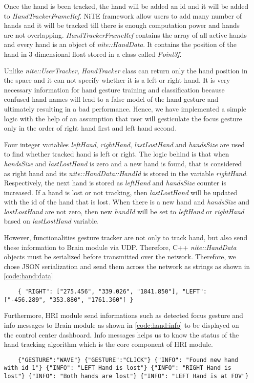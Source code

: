 Once the hand is been tracked, the hand will be added an id and it will be added to \textit{HandTrackerFrameRef}. NiTE framework allow users to add many number of hands and it will be tracked till there is enough computation power and hands are not overlapping. \textit{HandTrackerFrameRef} contains the array of all active hands and every hand is an object of \textit{nite::HandData}. It contains the position of the hand in 3 dimensional float stored in a class called \textit{Point3f}.

Unlike \textit{nite::UserTracker}, \textit{HandTracker} class can return only the hand position in the space and it can not specify whether it is a left or right hand. It is very necessary information for hand gesture training and classification because confused hand names will lead to a false model of the hand gesture and ultimately resulting in a bad performance. Hence, we have implemented a simple logic with the help of an assumption that user will gesticulate the focus gesture only in the order of right hand first and left hand second. 

Four integer variables \textit{leftHand}, \textit{rightHand}, \textit{lastLostHand} and \textit{handsSize} are used to find whether tracked hand is left or right. The logic behind is that when \textit{handsSize} and \textit{lastLostHand} is zero and a new hand is found, that is considered as right hand and its \textit{nite::HandData::HandId} is stored in the variable \textit{rightHand}. Respectively, the next hand is stored as \textit{leftHand} and \textit{handsSize} counter is increased. If a hand is lost or not tracking, then \textit{lastLostHand} will be updated with the id of the hand that is lost. When there is a new hand and \textit{handsSize} and \textit{lastLostHand} are not zero, then new \textit{handId} will be set to \textit{leftHand} or \textit{rightHand} based on \textit{lastLostHand} variable.

However, functionalities gesture tracker are not only to track hand, but also send these information to Brain module via UDP. Therefore, C++ \textit{nite::HandData} objects must be serialized before transmitted over the network. Therefore, we chose JSON serialization and send them across the network as strings as shown in \ref{code:hand:data} 
\begin{lstlisting}
	{ "RIGHT": ["275.456", "339.026", "1841.850"], "LEFT": ["-456.289", "353.880", "1761.360"] } 
\end{lstlisting}
\label{code:hand:data}

Furthermore, HRI module send informations such as detected focus gesture and info messages to Brain module as shown in \ref{code:hand:info} to be displayed on the control center dashboard. Info messages helps us to know the status of the hand tracking algorithm which is the core component of HRI module. 
\begin{lstlisting}
	{"GESTURE":"WAVE"} {"GESTURE":"CLICK"} {"INFO": "Found new hand with id 1"} {"INFO": "LEFT Hand is lost"} {"INFO": "RIGHT Hand is lost"} {"INFO": "Both hands are lost"} {"INFO": "LEFT Hand is at FOV"} 
\end{lstlisting}
\label{code:hand:info}

